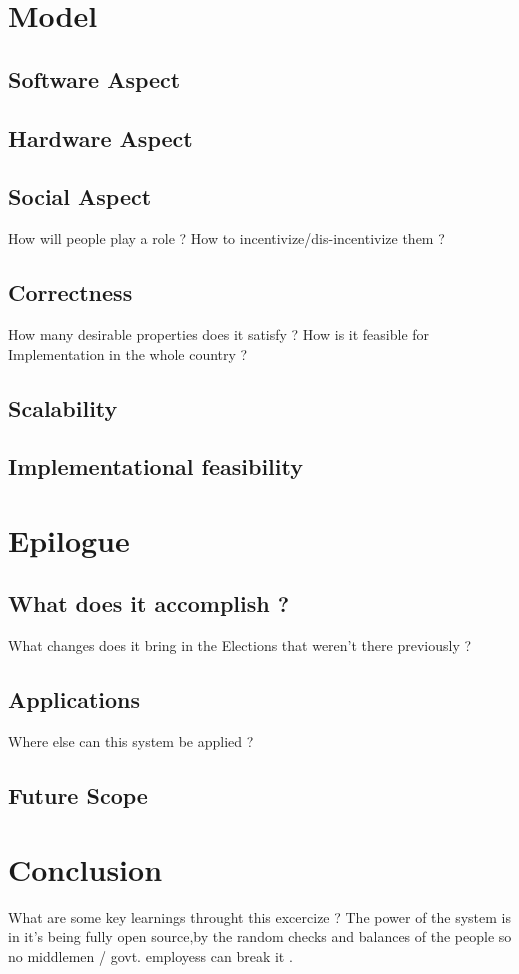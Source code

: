 \documentclass[12pt]{report}
\begin{document}
\chapter{Model}
\section{Software Aspect}
\section{Hardware Aspect}
\section{Social Aspect}
How will people play a role ? How to incentivize/dis-incentivize them ?
\section{Correctness}
How many desirable properties does it satisfy ? How is it feasible for Implementation in the whole country ?
\section{Scalability}
\section{Implementational feasibility}


\chapter{Epilogue}
\section{What does it accomplish ?}
What changes does it bring in the Elections that weren't there previously ?
\section{Applications}
Where else can this system be applied ?
\section{Future Scope}


\chapter{Conclusion}
What are some key learnings throught this excercize ? The power of the system is in it's being fully open source,by the random checks and balances of the people so no middlemen / govt. employess can break it .


\end{document}
